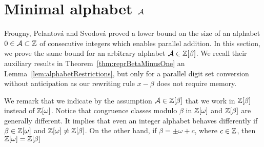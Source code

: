 \section{Minimal alphabet $\mathcal{A}$}
\label{sec:minimalAlphabet}	

Frougny, Pelantov\'a and Svodov\'a \cite{minAlph} proved a lower bound on the size of an alphabet $0\in\mathcal{A}\subset\mathbb{Z}$ of consecutive integers which enables parallel addition. In this section, we prove the same bound for an arbitrary alphabet $\mathcal{A}\in\mathbb{Z}[\beta]$.  We recall their auxiliary results in Theorem~\ref{thm:reprBetaMinusOne} an Lemma~\ref{lem:alphabetRestrictions}, but only for a parallel digit set conversion without anticipation as our rewriting rule $x-\beta$ does not require memory. 

We remark that we indicate by the assumption $\mathcal{A}\in\mathbb{Z}[\beta]$  that we work in $\mathbb{Z}[\beta]$ instead of $\mathbb{Z}[\omega]$. Notice that congruence classes modulo $\beta$ in $\mathbb{Z}[\omega]$ and $\mathbb{Z}[\beta]$ are generally different. It implies that even an integer alphabet behaves differently if $\beta\in\mathbb{Z}[\omega]$ and $\mathbb{Z}[\omega]\neq\mathbb{Z}[\beta]$. On the other hand, if $\beta=\pm \omega +c$, where $c\in\mathbb{Z}$, then $\mathbb{Z}[\omega]=\mathbb{Z}[\beta]$

